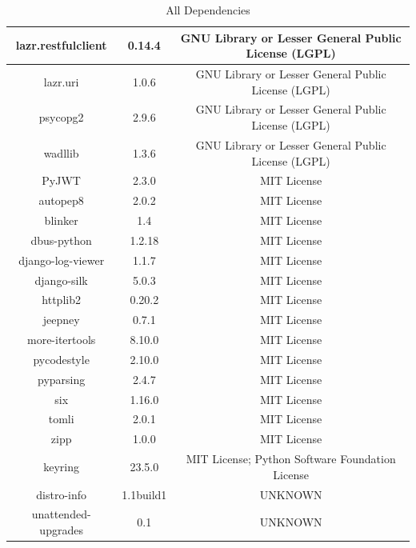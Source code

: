 \begin{table}[ht]
{\begin{tabular}{|c|c|c|}
lazr.restfulclient  & 0.14.4           & GNU Library or Lesser General Public License (LGPL)     \\ \hline
lazr.uri            & 1.0.6            & GNU Library or Lesser General Public License (LGPL)     \\ \hline
psycopg2            & 2.9.6            & GNU Library or Lesser General Public License (LGPL)     \\ \hline
wadllib             & 1.3.6            & GNU Library or Lesser General Public License (LGPL)     \\ \hline
PyJWT               & 2.3.0            & MIT License                                             \\ \hline
autopep8            & 2.0.2            & MIT License                                             \\ \hline
blinker             & 1.4              & MIT License                                             \\ \hline
dbus-python         & 1.2.18           & MIT License                                             \\ \hline
django-log-viewer   & 1.1.7            & MIT License                                             \\ \hline
django-silk         & 5.0.3            & MIT License                                             \\ \hline
httplib2            & 0.20.2           & MIT License                                             \\ \hline
jeepney             & 0.7.1            & MIT License                                             \\ \hline
more-itertools      & 8.10.0           & MIT License                                             \\ \hline
pycodestyle         & 2.10.0           & MIT License                                             \\ \hline
pyparsing           & 2.4.7            & MIT License                                             \\ \hline
six                 & 1.16.0           & MIT License                                             \\ \hline
tomli               & 2.0.1            & MIT License                                             \\ \hline
zipp                & 1.0.0            & MIT License                                             \\ \hline
keyring             & 23.5.0           & MIT License; Python Software Foundation License         \\ \hline
distro-info         & 1.1build1        & UNKNOWN                                                 \\ \hline
unattended-upgrades & 0.1              & UNKNOWN                                                 \\ \hline
\end{tabular}%
}
\caption{All Dependencies}
\label{tab:dependencies}
\end{table}
\newpage

